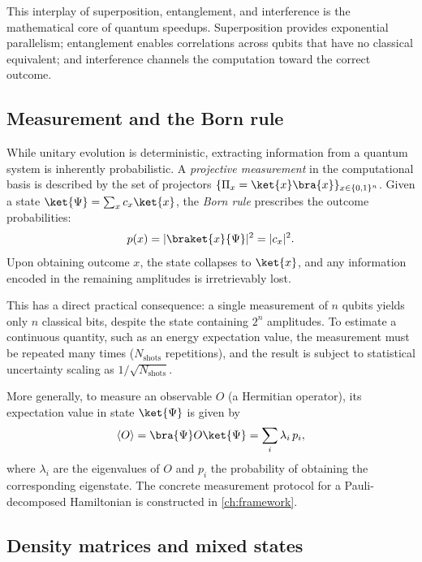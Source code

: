 This interplay of superposition, entanglement, and interference is the
mathematical core of quantum speedups. Superposition provides exponential
parallelism; entanglement enables correlations across qubits that have no
classical equivalent; and interference channels the computation toward the
correct outcome.


\subsection{Measurement and the Born rule}
\label{sec:measurement}

While unitary evolution is deterministic, extracting information from a quantum
system is inherently probabilistic. A \emph{projective measurement} in the
computational basis is described by the set of projectors
$\{\Pi_x = \ket{x}\bra{x}\}_{x\in\{0,1\}^n}$. Given a state
$\ket{\Psi}=\sum_x c_x\ket{x}$, the \emph{Born rule} prescribes the outcome
probabilities:
\begin{equation}
  \label{eq:born}
  p(x) = |\braket{x}{\Psi}|^2 = |c_x|^2.
\end{equation}
Upon obtaining outcome $x$, the state collapses to $\ket{x}$, and any
information encoded in the remaining amplitudes is irretrievably lost.

This has a direct practical consequence: a single measurement of $n$ qubits
yields only $n$ classical bits, despite the state containing $2^n$ amplitudes.
To estimate a continuous quantity, such as an energy expectation value, the
measurement must be repeated many times ($N_{\text{shots}}$ repetitions), and the
result is subject to statistical uncertainty scaling as $1/\sqrt{N_{\text{shots}}}$.

More generally, to measure an observable $O$ (a Hermitian operator), its
expectation value in state $\ket{\Psi}$ is given by
\begin{equation}
  \label{eq:expectation}
  \expval{O} = \bra{\Psi}O\ket{\Psi} = \sum_i \lambda_i\, p_i,
\end{equation}
where $\lambda_i$ are the eigenvalues of $O$ and $p_i$ the probability of
obtaining the corresponding eigenstate. The concrete measurement protocol
for a Pauli-decomposed Hamiltonian is constructed in \cref{ch:framework}.


\subsection{Density matrices and mixed states}
\label{sec:density}

